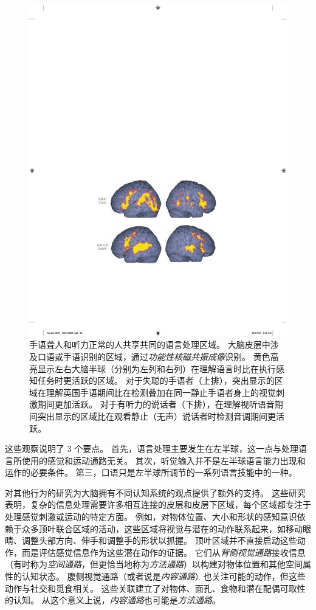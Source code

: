 \begin{figure}[htbp]
	\centering
	\includegraphics[width=0.82\linewidth]{chap01/fig_1_8}
	\caption{手语聋人和听力正常的人共享共同的语言处理区域。
		大脑皮层中涉及口语或手语识别的区域，通过\textit{功能性核磁共振成像}识别。
		黄色高亮显示左右大脑半球（分别为左列和右列）在理解语言时比在执行感知任务时更活跃的区域。
		对于失聪的手语者（上排），突出显示的区域在理解英国手语期间比在检测叠加在同一静止手语者身上的视觉刺激期间更加活跃。
		对于有听力的说话者（下排），在理解视听语音期间突出显示的区域比在观看静止（无声）说话者时检测音调期间更活跃\cite{macsweeney2002neural}。}
	\label{fig:1_8}
\end{figure}


这些观察说明了 3 个要点。
首先，语言处理主要发生在左半球，这一点与处理语言所使用的感觉和运动通路无关。
其次，听觉输入并不是左半球语言能力出现和运作的必要条件。
第三，口语只是左半球所调节的一系列语言技能中的一种。



对其他行为的研究为大脑拥有不同认知系统的观点提供了额外的支持。
这些研究表明，复杂的信息处理需要许多相互连接的皮层和皮层下区域，每个区域都专注于处理感觉刺激或运动的特定方面。
例如，对物体位置、大小和形状的感知意识依赖于众多顶叶联合区域的活动，这些区域将视觉与潜在的动作联系起来，如移动眼睛、调整头部方向、伸手和调整手的形状以抓握。
顶叶区域并不直接启动这些动作，而是评估感觉信息作为这些潜在动作的证据。
它们从\textit{背侧视觉通路}接收信息（有时称为\textit{空间通路}，但更恰当地称为\textit{方法通路}）以构建对物体位置和其他空间属性的认知状态。
腹侧视觉通路（或者说是\textit{内容通路}）也关注可能的动作，但这些动作与社交和觅食相关。
这些关联建立了对物体、面孔、食物和潜在配偶可取性的认知。
从这个意义上说，\textit{内容通路}也可能是\textit{方法通路}。



